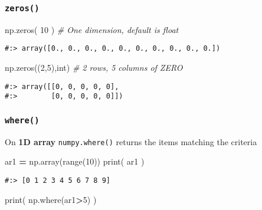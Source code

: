 \documentclass[
]{book}
\newenvironment{Shaded}{\begin{snugshade}}{\end{snugshade}}
\newcommand{\BuiltInTok}[1]{#1}
\newcommand{\CommentTok}[1]{\textcolor[rgb]{0.37,0.37,0.37}{\textit{#1}}}
\newcommand{\DecValTok}[1]{\textcolor[rgb]{0.06,0.06,0.06}{#1}}
\newcommand{\NormalTok}[1]{#1}
\newcommand{\OperatorTok}[1]{\textcolor[rgb]{0.43,0.43,0.43}{\textbf{#1}}}
\newcommand{\StringTok}[1]{\textcolor[rgb]{0.5,0.5,0.5}{#1}}
\begin{document}
\hypertarget{zeros}{%
\subsubsection{\texorpdfstring{\texttt{zeros()}}{zeros()}}\label{zeros}}

\begin{Shaded}
\begin{Highlighting}[]
\NormalTok{np.zeros( }\DecValTok{10}\NormalTok{ )    }\CommentTok{\# One dimension, default is float}
\end{Highlighting}
\end{Shaded}

\begin{verbatim}
#:> array([0., 0., 0., 0., 0., 0., 0., 0., 0., 0.])
\end{verbatim}

\begin{Shaded}
\begin{Highlighting}[]
\NormalTok{np.zeros((}\DecValTok{2}\NormalTok{,}\DecValTok{5}\NormalTok{),}\StringTok{\textquotesingle{}int\textquotesingle{}}\NormalTok{)   }\CommentTok{\# 2 rows, 5 columns of ZERO}
\end{Highlighting}
\end{Shaded}

\begin{verbatim}
#:> array([[0, 0, 0, 0, 0],
#:>        [0, 0, 0, 0, 0]])
\end{verbatim}

\hypertarget{where}{%
\subsubsection{\texorpdfstring{\texttt{where()}}{where()}}\label{where}}

On \textbf{1D array} \texttt{numpy.where()} returns the items matching the criteria

\begin{Shaded}
\begin{Highlighting}[]
\NormalTok{ar1 }\OperatorTok{=}\NormalTok{ np.array(}\BuiltInTok{range}\NormalTok{(}\DecValTok{10}\NormalTok{))}
\BuiltInTok{print}\NormalTok{( ar1 )}
\end{Highlighting}
\end{Shaded}

\begin{verbatim}
#:> [0 1 2 3 4 5 6 7 8 9]
\end{verbatim}

\begin{Shaded}
\begin{Highlighting}[]
\BuiltInTok{print}\NormalTok{( np.where(ar1}\OperatorTok{\textgreater{}}\DecValTok{5}\NormalTok{) )}
\end{Highlighting}
\end{Shaded}
\end{document}
